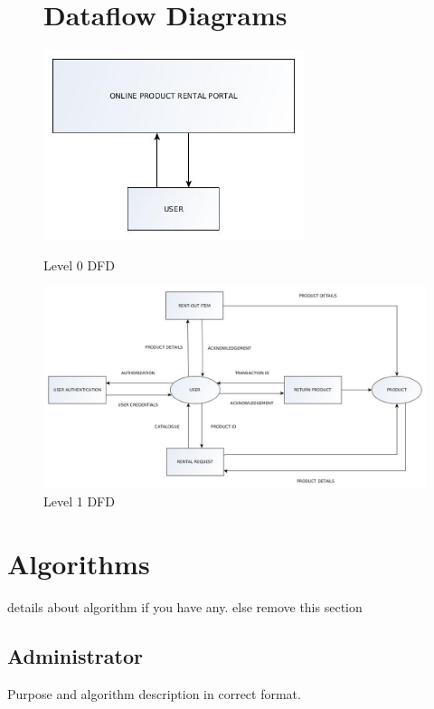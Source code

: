 \documentclass[11pt]{report}
\begin{document}
\begin{figure}[h]
\section{Dataflow Diagrams}
  \centering
    \includegraphics[width=3in]{level0.jpg} 
	\caption{Level 0 DFD}

\vspace{1cm}
  \centering
    \includegraphics[width=\textwidth]{level1.jpg} 
	\caption{Level 1 DFD}
\end{figure}





\section{Algorithms}
details about algorithm if you have any. else remove this section

\subsection{Administrator}
Purpose and algorithm description in correct format. %
\end{document}
